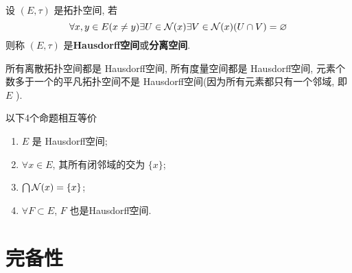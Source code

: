 \begin{Def}[Hausdorff空间]\label{def:Hausdorff空间}
       设 $ (E, \tau) $ 是拓扑空间, 若 
       \[
          \forall x, y\in E(x\neq y)\exists U\in \mathcal{N}(x)\exists V\in\mathcal{N}(x) (U\cap V)=\varnothing
       \]
       则称 $ (E, \tau) $ 是\textbf{Hausdorff空间}或\textbf{分离空间}. 
 \end{Def}
 \begin{Ex}
      所有离散拓扑空间都是 Hausdorff空间, 所有度量空间都是 Hausdorff空间, 元素个数多于一个的平凡拓扑空间不是 Hausdorff空间(因为所有元素都只有一个邻域, 即 $ E $ ). 
 \end{Ex}
 \begin{Prop}
      以下4个命题相互等价
      \begin{enumerate}[(1)]
           \item  $ E $ 是 Hausdorff空间;
           \item $ \forall x\in E $, 其所有闭邻域的交为 $\{ x \}$;
           \item $\bigcap \mathcal{N}(x)=\{x\}$;
           \item $ \forall F\subset E $, $ F $ 也是Hausdorff空间. 
      \end{enumerate}
 \end{Prop}
 
 \section{完备性}
